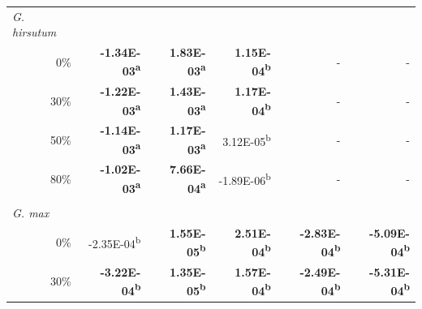 \begin{landscape}
\begin{table}
{\begin{tabular}{p{2cm}p{3cm}p{3cm}p{3cm}p{3cm}p{3cm}}
            \multicolumn{1}{l}{\textit{G. hirsutum}} \\
            \multicolumn{1}{r}{0\%}
            &  \multicolumn{1}{r}{\textbf{-1.34E-03\textsuperscript{a}}}
            &  \multicolumn{1}{r}{\textbf{ 1.83E-03\textsuperscript{a}}}
            &  \multicolumn{1}{r}{\textbf{ 1.15E-04\textsuperscript{b}}}
            &  \multicolumn{1}{r}{-}
            &  \multicolumn{1}{r}{-}
            \\
            \multicolumn{1}{r}{30\%}                     
            &  \multicolumn{1}{r}{\textbf{-1.22E-03\textsuperscript{a}}}
            &  \multicolumn{1}{r}{\textbf{ 1.43E-03\textsuperscript{a}}}
            &  \multicolumn{1}{r}{\textbf{ 1.17E-04\textsuperscript{b}}}
            &  \multicolumn{1}{r}{-}
            &  \multicolumn{1}{r}{-}
            \\
            \multicolumn{1}{r}{50\%}
            &  \multicolumn{1}{r}{\textbf{-1.14E-03\textsuperscript{a}}}
            &  \multicolumn{1}{r}{\textbf{ 1.17E-03\textsuperscript{a}}}
            &  \multicolumn{1}{r}{3.12E-05\textsuperscript{b}}
            &  \multicolumn{1}{r}{-}
            &  \multicolumn{1}{r}{-}
            \\
            \multicolumn{1}{r}{80\%}
            &  \multicolumn{1}{r}{\textbf{-1.02E-03\textsuperscript{a}}}
            &  \multicolumn{1}{r}{\textbf{ 7.66E-04\textsuperscript{a}}}
            &  \multicolumn{1}{r}{-1.89E-06\textsuperscript{b}}
            &  \multicolumn{1}{r}{-}
            &  \multicolumn{1}{r}{-}
            \\
            &&&& 
            \\
            \multicolumn{1}{l}{\textit{G. max}}
            \\
            \multicolumn{1}{r}{0\%}
            &  \multicolumn{1}{r}{ -2.35E-04\textsuperscript{b}}
            &  \multicolumn{1}{r}{\textbf{ 1.55E-05\textsuperscript{b}}}
            &  \multicolumn{1}{r}{\textbf{ 2.51E-04\textsuperscript{b}}}
            &  \multicolumn{1}{r}{\textbf{-2.83E-04\textsuperscript{b}}}
            &  \multicolumn{1}{r}{\textbf{-5.09E-04\textsuperscript{b}}}
            \\
              
            \multicolumn{1}{r}{30\%}
            &  \multicolumn{1}{r}{\textbf{-3.22E-04\textsuperscript{b}}}
            &  \multicolumn{1}{r}{\textbf{ 1.35E-05\textsuperscript{b}}}
            &  \multicolumn{1}{r}{\textbf{ 1.57E-04\textsuperscript{b}}}
            &  \multicolumn{1}{r}{\textbf{-2.49E-04\textsuperscript{b}}}
            &  \multicolumn{1}{r}{\textbf{-5.31E-04\textsuperscript{b}}}
            \\
              

\end{tabular}}
\end{table}
\end{landscape}

